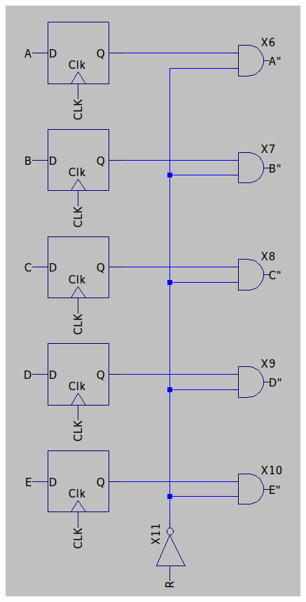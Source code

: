 \documentclass{homeworg}
\begin{document}
\begin{center}
        \includegraphics[scale=0.5]{dff5_reset_asc.png}
    \end{center}

\newpage
\end{document}
